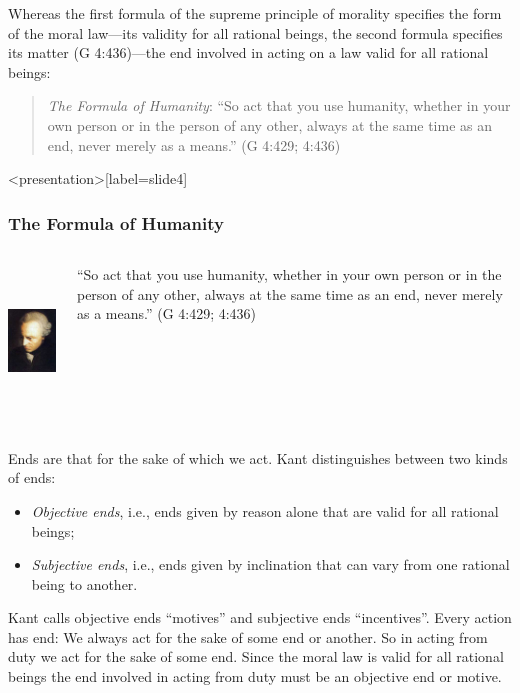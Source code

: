 Whereas the first formula of the supreme principle of morality specifies the form of the moral law---its validity for all rational beings, the second formula specifies its matter (G 4:436)---the end involved in acting on a law valid for all rational beings:
\begin{quote}
    \emph{The Formula of Humanity}: ``So act that you use humanity, whether in your own person or in the person of any other, always at the same time as an end, never merely as a means.'' (G 4:429; 4:436)
\end{quote}

\change

\begin{frame}<presentation>[label=slide4]
    \frametitle{The Formula of Humanity}
        \begin{columns}
            \begin{column}{3cm}
                \includegraphics[height=4cm]{../../../graphics/kant.jpg}
            \end{column}
            \begin{column}{7cm}
                ``So act that you use humanity, whether in your own person or in the person of any other, always at the same time as an end, never merely as a means.'' (G 4:429; 4:436)
            \end{column}
        \end{columns}
\end{frame}

Ends are that for the sake of which we act. Kant distinguishes between two kinds of ends:
\begin{itemize}
\item \emph{Objective ends}, i.e., ends given by reason alone that are valid for all rational beings;
\item \emph{Subjective ends}, i.e., ends given by inclination that can vary from one rational being to another.
\end{itemize}

Kant calls objective ends ``motives'' and subjective ends ``incentives''. Every action has end: We always act for the sake of some end or another. So in acting from duty we act for the sake of some end. Since the moral law is valid for all rational beings the end involved in acting from duty must be an objective end or motive.

